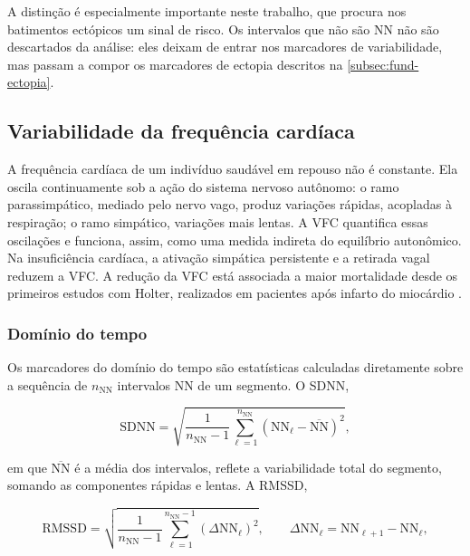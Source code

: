 A distinção é especialmente importante neste trabalho, que procura nos
batimentos ectópicos um sinal de risco. Os intervalos que não são NN não
são descartados da análise: eles deixam de entrar nos marcadores de
variabilidade, mas passam a compor os marcadores de ectopia descritos na
\autoref{subsec:fund-ectopia}.

\subsection{Variabilidade da frequência cardíaca}
\label{subsec:fund-vfc}

A frequência cardíaca de um indivíduo saudável em repouso não é constante.
Ela oscila continuamente sob a ação do sistema nervoso autônomo: o ramo
parassimpático, mediado pelo nervo vago, produz variações rápidas,
acopladas à respiração; o ramo simpático, variações mais lentas. A
\gls{VFC} quantifica essas oscilações e funciona, assim, como uma medida
indireta do equilíbrio autonômico. Na insuficiência cardíaca, a ativação
simpática persistente e a retirada vagal reduzem a \gls{VFC}. A redução da
\gls{VFC} está associada a maior mortalidade desde os primeiros estudos com
Holter, realizados em pacientes após infarto do miocárdio
\cite{kleiger1987decreased}.

\subsubsection{Domínio do tempo}

Os marcadores do domínio do tempo são estatísticas calculadas diretamente
sobre a sequência de $n_{\mathrm{NN}}$ intervalos NN de um segmento. O \gls{SDNN},

\begin{equation}
	\mathrm{SDNN} = \sqrt{\frac{1}{n_{\mathrm{NN}} - 1}
		\sum_{\ell=1}^{n_{\mathrm{NN}}}
		\left( \mathrm{NN}_\ell - \overline{\mathrm{NN}} \right)^2},
	\label{eq:sdnn}
\end{equation}

\noindent
em que $\overline{\mathrm{NN}}$ é a média dos intervalos, reflete a
variabilidade total do segmento, somando as componentes rápidas e lentas.
A \gls{RMSSD},

\begin{equation}
	\mathrm{RMSSD} = \sqrt{\frac{1}{n_{\mathrm{NN}} - 1}
		\sum_{\ell=1}^{n_{\mathrm{NN}} - 1} \left( \Delta \mathrm{NN}_\ell \right)^2},
	\qquad
	\Delta \mathrm{NN}_\ell = \mathrm{NN}_{\ell+1} - \mathrm{NN}_\ell,
	\label{eq:rmssd}
\end{equation}

